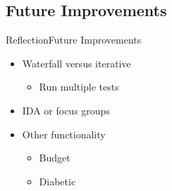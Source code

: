 \subsection{Future Improvements}
\begin{frame}{Reflection}{Future Improvements}
	\begin{itemize}
		\item Waterfall versus iterative
		\begin{itemize}
			\item Run multiple tests
		\end{itemize}
		\item IDA or focus groups
		\item Other functionality
		\begin{itemize}
			\item Budget
			\item Diabetic
		\end{itemize}
	\end{itemize}
\end{frame}
